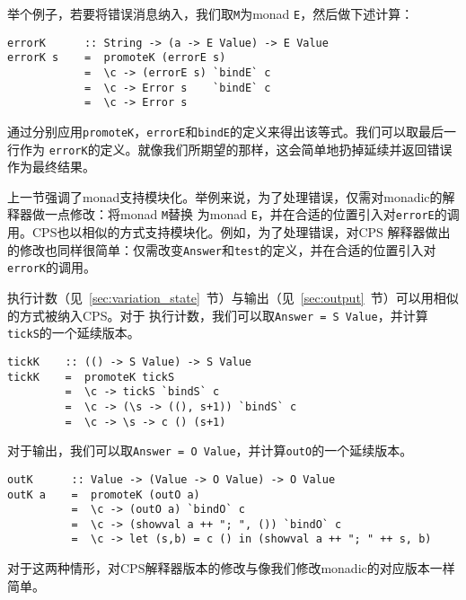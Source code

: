 \documentclass[12pt]{article}
\begin{document}
\indent{}举个例子，若要将错误消息纳入，我们取\texttt{M}为monad \texttt{E}，然后做下述计算：
\begin{verbatim}
errorK      :: String -> (a -> E Value) -> E Value
errorK s    =  promoteK (errorE s)
            =  \c -> (errorE s) `bindE` c
            =  \c -> Error s    `bindE` c
            =  \c -> Error s
\end{verbatim}
\noindent{}通过分别应用\texttt{promoteK}，\texttt{errorE}和\texttt{bindE}的定义来得出该等式。我们可以取最后一行作为
\texttt{errorK}的定义。就像我们所期望的那样，这会简单地扔掉延续并返回错误作为最终结果。

\indent{}上一节强调了monad支持模块化。举例来说，为了处理错误，仅需对monadic的解释器做一点修改：将monad \texttt{M}替换
为monad \texttt{E}，并在合适的位置引入对\texttt{errorE}的调用。CPS也以相似的方式支持模块化。例如，为了处理错误，对CPS
解释器做出的修改也同样很简单：仅需改变\texttt{Answer}和\texttt{test}的定义，并在合适的位置引入对\texttt{errorK}的调用。

\indent{}执行计数（见~\ref{sec:variation_state}~节）与输出（见~\ref{sec:output}~节）可以用相似的方式被纳入CPS。对于
执行计数，我们可以取\texttt{Answer = S Value}，并计算\texttt{tickS}的一个延续版本。
\begin{verbatim}
tickK    :: (() -> S Value) -> S Value
tickK    =  promoteK tickS
         =  \c -> tickS `bindS` c
         =  \c -> (\s -> ((), s+1)) `bindS` c
         =  \c -> \s -> c () (s+1)
\end{verbatim}
\noindent{}对于输出，我们可以取\texttt{Answer = O Value}，并计算\texttt{outO}的一个延续版本。
\begin{verbatim}
outK      :: Value -> (Value -> O Value) -> O Value
outK a    =  promoteK (outO a)
          =  \c -> (outO a) `bindO` c
          =  \c -> (showval a ++ "; ", ()) `bindO` c
          =  \c -> let (s,b) = c () in (showval a ++ "; " ++ s, b)
\end{verbatim}
\noindent{}对于这两种情形，对CPS解释器版本的修改与像我们修改monadic的对应版本一样简单。
\end{document}
